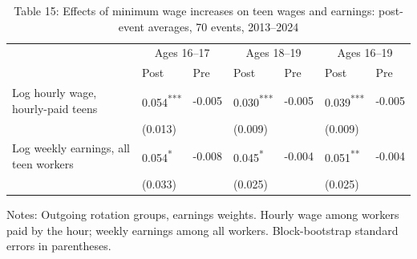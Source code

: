 \documentclass[12pt]{article}
\begin{document}
\begin{table}
\centering
\caption{Table 15: Effects of minimum wage increases on teen wages and earnings: post-event averages, 70 events, 2013--2024}

\small
\begin{tabular}{p{}p{}p{}p{}p{}p{}p{}}
\toprule
 & \multicolumn{2}{c}{Ages 16--17} & \multicolumn{2}{c}{Ages 18--19} & \multicolumn{2}{c}{Ages 16--19} \\

 & Post & Pre & Post & Pre & Post & Pre \\
\midrule
Log hourly wage, hourly-paid teens & 0.054\textsuperscript{***} & -0.005 & 0.030\textsuperscript{***} & -0.005 & 0.039\textsuperscript{***} & -0.005 \\
 & (0.013) &  & (0.009) &  & (0.009) &  \\
Log weekly earnings, all teen workers & 0.054\textsuperscript{*} & -0.008 & 0.045\textsuperscript{*} & -0.004 & 0.051\textsuperscript{**} & -0.004 \\
 & (0.033) &  & (0.025) &  & (0.025) &  \\
\bottomrule
\end{tabular}



\noindent\small Notes: Outgoing rotation groups, earnings weights. Hourly wage among workers paid by the hour; weekly earnings among all workers. Block-bootstrap standard errors in parentheses.

\end{table}
\end{document}
